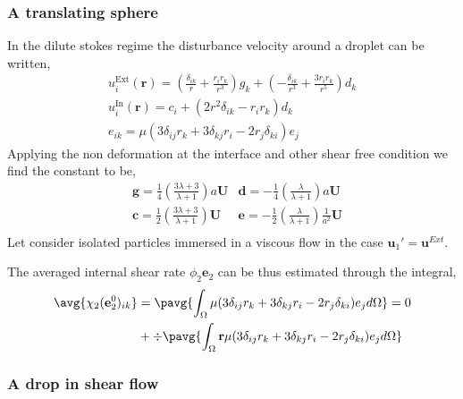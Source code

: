 \subsubsection{A translating sphere}
In the dilute stokes regime the disturbance velocity around a droplet can be written, 
\begin{align*}
    u_i^\text{Ext}(\textbf{r})
    = \left(\frac{\delta_{ik}}{r} + \frac{r_ir_k}{r^3}\right)  g_k
    + \left(-\frac{\delta_{ik}}{r^3} + \frac{3r_ir_k}{r^5}\right)  d_k\\
    u_i^\text{In}(\textbf{r})
    = c_i
    + \left(2 r^2 \delta_{ik} - r_ir_k\right) d_k\\
    e_{ik}
    = \mu(
        3 \delta_{ij} r_k 
        + 3 \delta_{kj} r_i
        -2 r_j \delta_{ki}
    )e_j 
\end{align*}
Applying the non deformation at the interface and other shear free condition we find the constant to be, 
\begin{align*}
    &\textbf{g} = \frac{1}{4}\left(\frac{3\lambda + 3}{\lambda +1}\right) a \textbf{U}
    &\textbf{d} = -\frac{1}{4}\left(\frac{\lambda}{\lambda +1}\right) a \textbf{U}\\
    &\textbf{c} = \frac{1}{2}\left(\frac{3\lambda + 3}{\lambda +1}\right) \textbf{U}
    &\textbf{e} = -\frac{1}{2}\left(\frac{\lambda}{\lambda +1}\right) \frac{1}{a^2} \textbf{U}\\
\end{align*}
Let consider isolated particles immersed in a viscous flow in the case $\textbf{u}_1' = \textbf{u}^{Ext}$.

The averaged internal shear rate $\phi_2 \textbf{e}_2$ can be thus estimated through the integral, 
\begin{align*}
    \avg{\chi_2 (\textbf{e}_2^0)_{ik}}
    &= \pavg{\int_{\Omega} \mu(
        3 \delta_{ij} r_k 
        + 3 \delta_{kj} r_i
        -2 r_j \delta_{ki}
    )e_j d\Omega}
    = 0\\
    &+ \div \pavg{\int_{\Omega} \textbf{r}\mu(
        3 \delta_{ij} r_k 
        + 3 \delta_{kj} r_i
        -2 r_j \delta_{ki}
    )e_j d\Omega}
\end{align*}
\subsubsection{A drop in shear flow}

